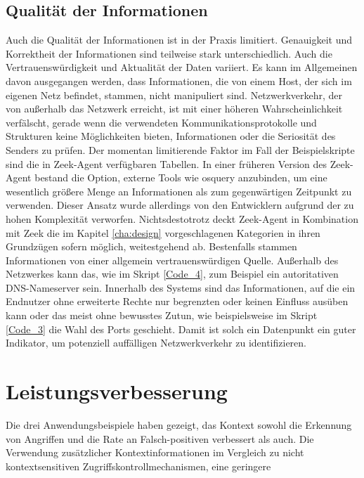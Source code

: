 \subsection{Qualität der Informationen}
Auch die Qualität der Informationen ist in der Praxis limitiert. Genauigkeit und Korrektheit der Informationen sind teilweise stark unterschiedlich. Auch die Vertrauenswürdigkeit und Aktualität der Daten variiert. Es kann im Allgemeinen davon ausgegangen werden, dass Informationen, die von einem Host, der sich im eigenen Netz befindet, stammen, nicht manipuliert sind. Netzwerkverkehr, der von außerhalb das Netzwerk erreicht, ist mit einer höheren Wahrscheinlichkeit verfälscht, gerade wenn die verwendeten Kommunikationsprotokolle und Strukturen keine Möglichkeiten bieten, Informationen oder die Seriosität des Senders zu prüfen.
Der momentan limitierende Faktor im Fall der Beispielskripte sind die in Zeek-Agent verfügbaren Tabellen. In einer früheren Version des Zeek-Agent bestand die Option, externe Tools wie osquery anzubinden, um eine wesentlich größere Menge an Informationen als zum gegenwärtigen Zeitpunkt zu verwenden. Dieser Ansatz wurde allerdings von den Entwicklern aufgrund der zu hohen Komplexität verworfen. Nichtsdestotrotz deckt Zeek-Agent in Kombination mit Zeek die im Kapitel \ref{cha:design} vorgeschlagenen Kategorien in ihren Grundzügen sofern möglich, weitestgehend ab.
Bestenfalls stammen Informationen von einer allgemein vertrauenswürdigen Quelle. Außerhalb des Netzwerkes kann das, wie im Skript \ref{Code_4}, zum Beispiel ein autoritativen DNS-Nameserver sein. Innerhalb des Systems sind das Informationen, auf die ein Endnutzer ohne erweiterte Rechte nur begrenzten oder keinen Einfluss ausüben kann oder das meist ohne bewusstes Zutun, wie beispielsweise im Skript \ref{Code_3} die Wahl des Ports geschieht. Damit ist solch ein Datenpunkt ein guter Indikator, um potenziell auffälligen Netzwerkverkehr zu identifizieren.
\section{Leistungsverbesserung}
Die drei Anwendungsbeispiele haben gezeigt, das Kontext sowohl die Erkennung von Angriffen und die Rate an Falsch-positiven verbessert als auch. Die Verwendung zusätzlicher Kontextinformationen im Vergleich zu nicht kontextsensitiven Zugriffskontrollmechanismen, eine geringere